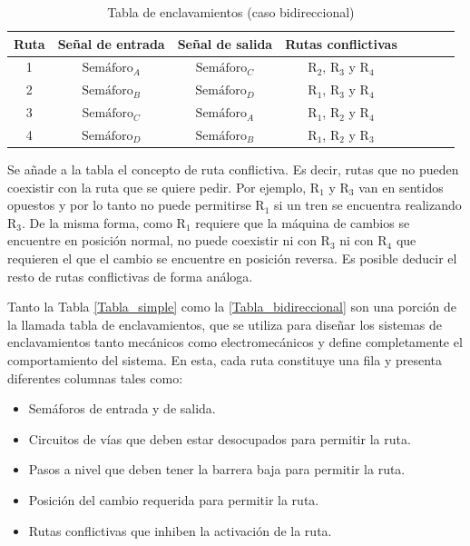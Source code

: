 		\begin{table}[!hbt]
		\renewcommand{\arraystretch}{1.3}
	
		\caption{Tabla de enclavamientos (caso bidireccional)}
		\label{Tabla_total}
		\centering
	
		\begin{tabular}{c c c c c c c c }
		\hline
		Ruta & Señal de entrada & Señal de salida & Rutas conflictivas \\
		\hline
		 1 & $\text{Semáforo}_A$  & $\text{Semáforo}_C$ & $\text{R}_2$, $\text{R}_3$ y $\text{R}_4$ \\
		 2 & $\text{Semáforo}_B$  & $\text{Semáforo}_D$ & $\text{R}_1$, $\text{R}_3$ y $\text{R}_4$ \\
		 3 & $\text{Semáforo}_C$  & $\text{Semáforo}_A$ & $\text{R}_1$, $\text{R}_2$ y $\text{R}_4$ \\
		 4 & $\text{Semáforo}_D$  & $\text{Semáforo}_B$ & $\text{R}_1$, $\text{R}_2$ y $\text{R}_3$ \\
		\hline
		\end{tabular}
		\end{table}
		
		Se añade a la tabla el concepto de ruta conflictiva. Es decir, rutas que no pueden coexistir con la ruta que se quiere pedir. Por ejemplo, $\text{R}_1$ y $\text{R}_3$ van en sentidos opuestos y por lo tanto no puede permitirse $\text{R}_1$ si un tren se encuentra realizando $\text{R}_3$. De la misma forma, como $\text{R}_1$ requiere que la máquina de cambios se encuentre en posición normal, no puede coexistir ni con $\text{R}_3$ ni con $\text{R}_4$ que requieren el que el cambio se encuentre en posición reversa. Es posible deducir el resto de rutas conflictivas de forma análoga.
			
		Tanto la Tabla \ref{Tabla_simple} como la \ref{Tabla_bidireccional} son una porción de la llamada tabla de enclavamientos, que se utiliza para diseñar los sistemas de enclavamientos tanto mecánicos como electromecánicos y define completamente el comportamiento del sistema. En esta, cada ruta constituye una fila y presenta diferentes columnas tales como:
		
		\begin{itemize}
			\item Semáforos de entrada y de salida.
			\item Circuitos de vías que deben estar desocupados para permitir la ruta.
			\item Pasos a nivel que deben tener la barrera baja para permitir la ruta.
			\item Posición del cambio requerida para permitir la ruta.
			\item Rutas conflictivas que inhiben la activación de la ruta.
		\end{itemize}
		
